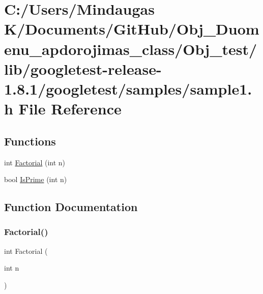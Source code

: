 \hypertarget{_obj__test_2lib_2googletest-release-1_88_81_2googletest_2samples_2sample1_8h}{}\section{C\+:/\+Users/\+Mindaugas K/\+Documents/\+Git\+Hub/\+Obj\+\_\+\+Duomenu\+\_\+apdorojimas\+\_\+class/\+Obj\+\_\+test/lib/googletest-\/release-\/1.8.1/googletest/samples/sample1.h File Reference}
\label{_obj__test_2lib_2googletest-release-1_88_81_2googletest_2samples_2sample1_8h}
\subsection*{Functions}
\begin{DoxyCompactItemize}
\item 
int \mbox{\hyperlink{_obj__test_2lib_2googletest-release-1_88_81_2googletest_2samples_2sample1_8h_a0e7da4d7a69c5b5afb707807aa177017}{Factorial}} (int n)
\item 
bool \mbox{\hyperlink{_obj__test_2lib_2googletest-release-1_88_81_2googletest_2samples_2sample1_8h_a7093217f5edc11fe277d03bd064e5f11}{Is\+Prime}} (int n)
\end{DoxyCompactItemize}


\subsection{Function Documentation}
\mbox{\label{_obj__test_2lib_2googletest-release-1_88_81_2googletest_2samples_2sample1_8h_a0e7da4d7a69c5b5afb707807aa177017}} 
\subsubsection{\texorpdfstring{Factorial()}{Factorial()}}
{\footnotesize\ttfamily int Factorial (\begin{DoxyParamCaption}\item[{int}]{n }\end{DoxyParamCaption})}

